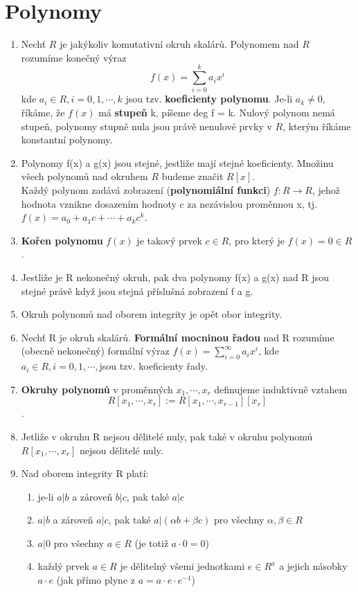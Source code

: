 \documentclass[12pt,a4paper]{article}
\begin{document}
\section{Polynomy}
	\begin{enumerate}
      \item Nechť $R$ je jakýkoliv komutativní okruh skalárů. Polynomem nad $R$ rozumíme konečný výraz
      \[f(x)=\sum_{i=0}^{k}a_ix^i\] kde $a_i \in R, i=0,1,\cdots,k$ jsou tzv. \textbf{koeficienty polynomu}. Je-li $a_k\neq0$, říkáme, že $f(x)$ má \textbf{stupeň} k, píšeme deg f = k. Nulový polynom nemá stupeň, polynomy stupně nula jsou právě nenulové prvky v $R$, kterým říkáme konstantní polynomy.

      \item Polynomy f(x) a g(x) jsou stejné, jestliže mají stejné koeficienty. Množinu všech polynomů nad okruhem $R$ budeme značit $R[x]$.\\Každý polynom zadává zobrazení (\textbf{polynomiální funkci}) $f:R\rightarrow R$, jehož hodnota vznikne dosazením hodnoty c za nezávislou proměnnou x, tj. $f(x)=a_0+a_1c+\cdots+a_kc^k$.

      \item \textbf{Kořen polynomu} $f(x)$ je takový prvek $c\in R$, pro který je $f(x) = 0\in R$.

      \item Jestliže je R nekonečný okruh, pak dva polynomy f(x) a g(x) nad R jsou stejné právě když jsou stejná příslušná zobrazení f a g.

      \item Okruh polynomů nad oborem integrity je opět obor integrity.
      
      	\item Nechť R je okruh skalárů. \textbf{Formální mocninou řadou} nad R rozumíme (obecně nekonečný) formální výraz $f(x) = \sum_{i=0}^{\infty}a_ix^i$, kde $a_i \in R, i=0,1,\cdots,$jsou tzv. koeficienty řady.
      
      \item \textbf{Okruhy polynomů} v proměnných $x_1,\cdots,x_r$ definujeme induktivně vztahem 
      \[R[x_1,\cdots,x_r]:=R[x_1,\cdots,x_{r-1}][x_r]\]. 
      
      \item Jetliže v okruhu R nejsou dělitelé nuly, pak také v okruhu polynomů $R[x_1,\cdots,x_r]$ nejsou dělitelé nuly.
      
      \item Nad oborem integrity R platí:
      \begin{enumerate}
      	\item je-li $a|b$ a zároveň $b|c$, pak také $a|c$
      	\item $a|b$ a zároveň $a|c$, pak také $a|(\alpha b +\beta c)$ pro všechny $\alpha,\beta \in R$
      	\item $a|0$ pro všechny $a\in R$ (je totiž $a\cdot0=0$)
      	\item každý prvek $a \in R$ je dělitelný všemi jednotkami $e\in R^x$ a jejich násobky $a\cdot e$ (jak přímo plyne z $a=a\cdot e\cdot e^{-1}$)
      \end{enumerate}
      

\end{enumerate}
\end{document}
